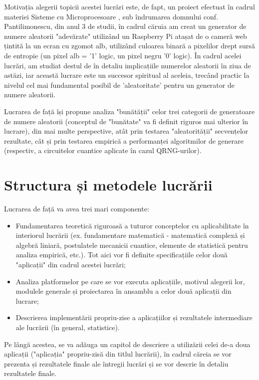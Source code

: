 Motivația alegerii topicii acestei lucrări este, de fapt, un proiect efectuat în cadrul materiei Sisteme cu Microprocesoare \cite{misc:web:proiectSM}, sub îndrumarea domnului conf. Pantilimonescu, din anul 3 de studii, în cadrul căruia am creat un generator de numere aleatorii "adevărate" utilizând un Raspberry Pi atașat de o cameră web țintită la un ecran cu zgomot alb, utilizând culoarea binară a pixelilor drept sursă de entropie (un pixel alb = '1' logic, un pixel negru '0' logic). În cadrul acelei lucrări, am studiat destul de în detaliu implicațiile numerelor aleatorii în ziua de astăzi, iar această lucrare este un succesor spiritual al aceleia, trecând practic la nivelul cel mai fundamental posibil de 'aleatoritate' pentru un generator de numere aleatorii.

Lucrarea de față își propune analiza "bunătății" celor trei categorii de generatoare de numere aleatorii (conceptul de "bunătate" va fi definit riguros mai ulterior în lucrare), din mai multe perspective, atât prin testarea "aleatorității" secvențelor rezultate, cât și prin testarea empirică a performanței algoritmilor de generare (respectiv, a circuitelor cuantice aplicate în cazul QRNG-urilor). 

\pagebreak

\section{Structura și metodele lucrării}
Lucrarea de față va avea trei mari componente:
\begin{itemize}
    \item Fundamentarea teoretică riguroasă a tuturor conceptelor cu aplicabilitate în interiorul lucrării (ex. fundamentare matematică - matematică complexă și algebră liniară, postulatele mecanicii cuantice, elemente de statistică pentru analiza empirică, etc.). Tot aici vor fi definite specificațiile celor două "aplicații" din cadrul acestei lucrări;
    \item Analiza platformelor pe care se vor executa aplicațiile, motivul alegerii lor, modulele generale și proiectarea în ansamblu a celor două aplicații din lucrare;
    \item Descrierea implementării propriu-zise a aplicațiilor și rezultatele intermediare ale lucrării (în general, statistice).
\end{itemize}

Pe lângă acestea, se va adăuga un capitol de descriere a utilizării celei de-a doua aplicații ("aplicația" propriu-zisă din titlul lucrării), în cadrul căreia se vor prezenta și rezultatele finale ale întregii lucrări și se vor descrie în detaliu rezultatele finale.


